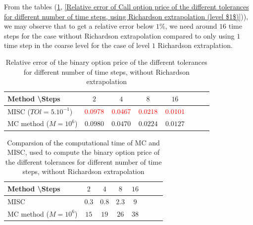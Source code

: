\documentclass[11pt]{article}
\begin{document}
From the tables (\ref{Relative error of the binary option price of the different tolerances for different number of time steps.}, \ref{Relative error of Call option price of the different tolerances for different number of time steps, using Richardson extrapolation (level $1$)})), we may observe that to get a relative error below $1\%$, we need around $16$ time steps for the case without Richardson extrapolation compared to only using $1$ time step in the coarse level for the case of level $1$ Richardson extraplation. 
\begin{table}[h!]
	\centering
	\begin{tabular}{l*{6}{c}r}
		Method \textbackslash  Steps            & $2$ & $4$ & $8$ & $16$ &   \\
		\hline
		MISC ($TOl=5.10^{-1}$)  & $  {\color{red}0.0978}$ & $ {\color{red}  0.0467}$ & ${\color{red}0.0218}$ & ${\color{red}0.0101}$  \\
		MC method ($M=10^{6}$)   & $\mathbf{0.0980}$  & $\mathbf{0.0470}$  & $\mathbf{0.0224}$ & $\mathbf{0.0127}$  \\	
		\hline
	\end{tabular}
	\caption{Relative error of the binary option price of the different tolerances for different number of time steps, without Richardson extrapolation}
	\label{Relative error of the binary option price of the different tolerances for different number of time steps.}
\end{table}



\begin{table}[h!]
	\centering
	\begin{tabular}{l*{6}{c}r}
		Method \textbackslash  Steps            & $2$ & $4$ & $8$ & $16$ &   \\
		\hline
		MISC   & $ 0.3$ & $0.8$ & $2.3$ & $9$  \\
		MC method ($M=10^{6}$)   & $15$  & $19$  & $26$ & $38$  \\	
		\hline
	\end{tabular}
	\caption{Comparsion of the computational time of  MC and MISC, used to compute the binary option price of the different tolerances for different number of time steps, without Richardson extrapolation}
	\label{Comparsion of the computational time of  MC and MISC, used to compute the binary option price of the different tolerances for different number of time steps, without Richardson extrapolation.}
\end{table}
\end{document}
